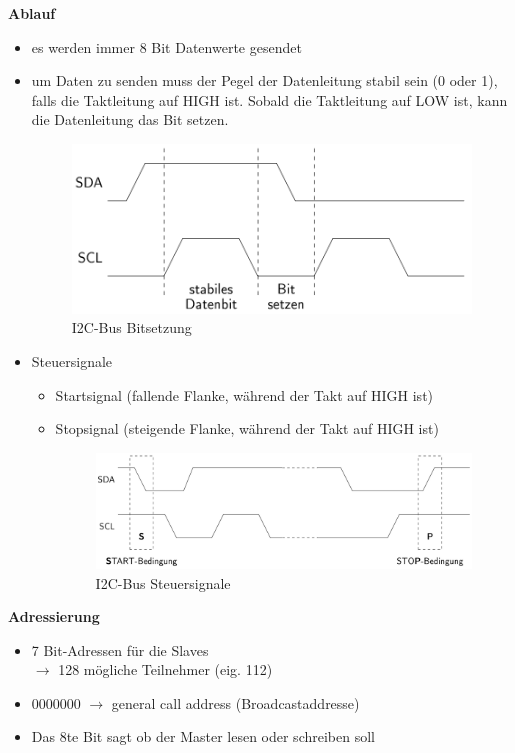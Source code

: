 \textbf{Ablauf} \\
\begin{itemize}
	\item es werden immer 8 Bit Datenwerte gesendet
	\item um Daten zu senden muss der Pegel der Datenleitung stabil sein (0 oder 1), falls die Taktleitung auf HIGH ist. Sobald die Taktleitung auf LOW ist, kann die Datenleitung das Bit setzen.
	\begin{figure}[H]
		\centering
		\includegraphics[width=0.8\linewidth]{figures/i2c2.png}
		\caption{I2C-Bus Bitsetzung}
	\end{figure}
	\item Steuersignale
	\begin{itemize}
		\item Startsignal (fallende Flanke, während der Takt auf HIGH ist)
		\item Stopsignal (steigende Flanke, während der Takt auf HIGH ist)
		\begin{figure}[H]
			\centering
			\includegraphics[width=0.8\linewidth]{figures/i2c3.png}
			\caption{I2C-Bus Steuersignale}
		\end{figure}
	\end{itemize}
\end{itemize}

\textbf{Adressierung}
\begin{itemize}
	\item 7 Bit-Adressen für die Slaves \\
	$\rightarrow$ 128 mögliche Teilnehmer (eig. 112)
	\item 0000000 $\rightarrow$ general call address (Broadcastaddresse)
	\item Das 8te Bit sagt ob der Master lesen oder schreiben soll
\end{itemize}

